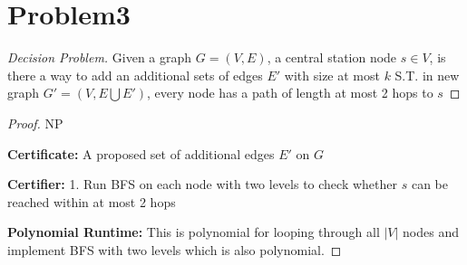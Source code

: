 \documentclass[openany]{article}
\begin{document}
\section*{Problem3}

\begin{proof}[Decision Problem]
    \renewcommand{\qedsymbol}{}
        Given a graph $G=(V,E)$, a central station node $s\in V$, is there a way to add an additional sets of edges $E'$ with size at most $k$ S.T. in new graph $G'=(V, E\bigcup E')$, every node has a path of length at most 2 hops to $s$    
\end{proof}
\begin{proof}{NP}

    \textbf{Certificate:} A proposed set of additional edges $E'$ on $G$

    \textbf{Certifier:} 1. Run BFS on each node with two levels to check whether $s$ can be reached within at most 2 hops

    \textbf{Polynomial Runtime:} This is polynomial for looping through all $|V|$ nodes and implement BFS with two levels which is also polynomial.

   
\end{proof}
\end{document}
